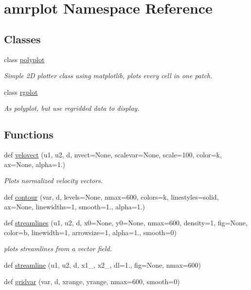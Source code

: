\hypertarget{namespaceamrplot}{}\section{amrplot Namespace Reference}
\label{namespaceamrplot}
\subsection*{Classes}
\begin{DoxyCompactItemize}
\item 
class \hyperlink{classamrplot_1_1polyplot}{polyplot}
\begin{DoxyCompactList}\small\item\em Simple 2D plotter class using matplotlib, plots every cell in one patch. \end{DoxyCompactList}\item 
class \hyperlink{classamrplot_1_1rgplot}{rgplot}
\begin{DoxyCompactList}\small\item\em As polyplot, but use regridded data to display. \end{DoxyCompactList}\end{DoxyCompactItemize}
\subsection*{Functions}
\begin{DoxyCompactItemize}
\item 
def \hyperlink{namespaceamrplot_ae376991fb7aa92c1e8a41501d7910479}{velovect} (u1, u2, d, nvect=None, scalevar=None, scale=100, color=\textquotesingle{}k\textquotesingle{}, ax=None, alpha=1.)
\begin{DoxyCompactList}\small\item\em Plots normalized velocity vectors. \end{DoxyCompactList}\item 
def \hyperlink{namespaceamrplot_a6c85688725768d179b09bc02dffca0f3}{contour} (var, d, levels=None, nmax=600, colors=\textquotesingle{}k\textquotesingle{}, linestyles=\textquotesingle{}solid\textquotesingle{}, ax=None, linewidths=1, smooth=1., alpha=1.)
\item 
def \hyperlink{namespaceamrplot_afd42022e288c73e942784cf1207fa538}{streamlines} (u1, u2, d, x0=None, y0=None, nmax=600, density=1, fig=None, color=\textquotesingle{}b\textquotesingle{}, linewidth=1, arrowsize=1, alpha=1., smooth=0)
\begin{DoxyCompactList}\small\item\em plots streamlines from a vector field. \end{DoxyCompactList}\item 
def \hyperlink{namespaceamrplot_a214eccffe1d56a25d80925cc453f5a23}{streamline} (u1, u2, d, x1\+\_, x2\+\_, dl=1., fig=None, nmax=600)
\item 
def \hyperlink{namespaceamrplot_aa8e7367464df74565e4c8ab85660def0}{gridvar} (var, d, xrange, yrange, nmax=600, smooth=0)
\end{DoxyCompactItemize}
